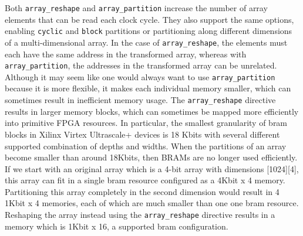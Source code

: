 Both \lstinline{array_reshape} and \lstinline{array_partition} increase the number of array elements that can be read each clock cycle.  They also support the same options, enabling \lstinline{cyclic} and \lstinline{block} partitions or partitioning along different dimensions of a multi-dimensional array.  In the case of \lstinline{array_reshape}, the elements must each have the same address in the transformed array, whereas with \lstinline{array_partition}, the addresses in the transformed array can be unrelated.  Although it may seem like one would always want to use \lstinline{array_partition} because it is more flexible, it makes each individual memory smaller, which can sometimes result in inefficient memory usage.  The \lstinline{array_reshape} directive results in larger memory blocks, which can sometimes be mapped more efficiently into primitive FPGA resources.   In particular, the smallest granularity of \gls{bram} blocks in Xilinx Virtex Ultrascale+ devices is 18 Kbits with several different supported combination of depths and widths.  When the partitions of an array become smaller than around 18Kbits, then BRAMs are no longer used efficiently.  If we start with an original array which is a 4-bit array with dimensions [1024][4], this array can fit in a single \gls{bram} resource configured as a 4Kbit x 4 memory.  Partitioning this array completely in the second dimension would result in 4 1Kbit x 4 memories, each of which are much smaller than one one \gls{bram} resource.  Reshaping the array instead using the \lstinline{array_reshape} directive results in a memory which is 1Kbit x 16, a supported \gls{bram} configuration.




